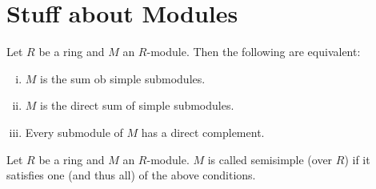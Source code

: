 \chapter{Stuff about Modules}


\begin{prop}\label{prop: characterisation semisimple modules}
 Let $R$ be a ring and $M$ an $R$-module. Then the following are equivalent:
 \begin{enumerate}[i)]
  \item
  $M$ is the sum ob simple submodules. \label{enum: sum of simple}
  \item
  $M$ is the direct sum of simple submodules. \label{enum: direct sum of simple}
  \item
  Every submodule of $M$ has a direct complement. \label{enum: direct complements}
 \end{enumerate}
\end{prop}


\begin{defi}
 Let $R$ be a ring and $M$ an $R$-module. $M$ is called semisimple (over $R$) if it satisfies one (and thus all) of the above conditions.
\end{defi}


